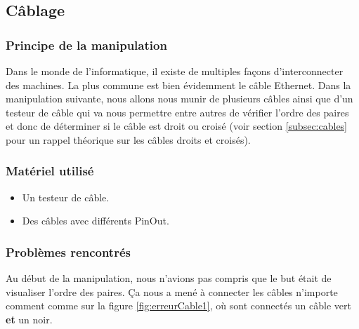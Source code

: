 \documentclass[a4paper]{article}
\begin{document}
\subsection{Câblage}










\subsubsection{Principe de la manipulation}





Dans le monde de l’informatique, il existe de multiples façons d’interconnecter des machines. La plus commune est bien évidemment le câble Ethernet. Dans la manipulation suivante, nous allons nous munir de plusieurs câbles ainsi que d’un testeur de câble qui va nous permettre entre autres de vérifier l’ordre des paires et donc de déterminer si le câble est droit ou croisé (voir section \ref{subsec:cables} pour un rappel théorique sur les câbles droits et croisés).










\subsubsection{Matériel utilisé}





\begin{itemize}
  \item Un testeur de câble.
  \item Des câbles avec différents PinOut.
\end{itemize}










\subsubsection{Problèmes rencontrés}





Au début de la manipulation, nous n’avions pas compris que le but était de visualiser l’ordre des paires. Ça nous a mené à connecter les câbles n’importe comment comme sur la figure \ref{fig:erreurCable1}, où sont connectés un câble vert \textbf{et} un noir.
\end{document}
